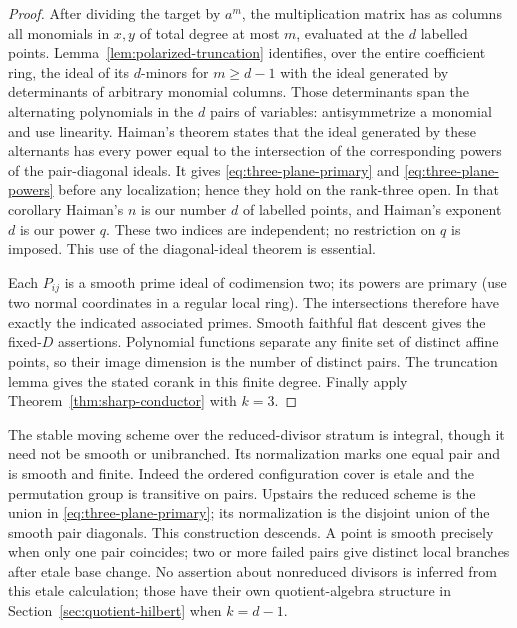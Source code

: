 \begin{proof}
After dividing the target by $a^m$, the multiplication matrix has
as columns all monomials in $x,y$ of total degree at most $m$,
evaluated at the $d$ labelled points. Lemma~\ref{lem:polarized-truncation}
identifies, over the entire coefficient ring, the ideal of its
$d$-minors for $m\ge d-1$ with the ideal generated by determinants
of arbitrary monomial columns. Those determinants span the
alternating polynomials in the $d$ pairs of variables: antisymmetrize
a monomial and use linearity. Haiman's theorem
\cite[Corollary 3.8.3]{Haiman} states that the ideal generated by these
alternants has every power equal to the intersection of the
corresponding powers of the pair-diagonal ideals. It gives
\eqref{eq:three-plane-primary} and \eqref{eq:three-plane-powers}
before any localization; hence they hold on the rank-three open.
In that corollary Haiman's $n$ is our number $d$ of labelled points,
and Haiman's exponent $d$ is our power $q$. These two indices are
independent; no restriction on $q$ is imposed.
This use of the diagonal-ideal theorem is essential.

Each $P_{ij}$ is a smooth prime ideal of codimension two; its powers
are primary (use two normal coordinates in a regular local ring).
The intersections therefore have exactly the indicated associated
primes. Smooth faithful flat descent gives the fixed-$D$ assertions.
Polynomial functions separate any finite set of distinct affine
points, so their image dimension is the number of distinct pairs.
The truncation lemma gives the stated corank in this finite degree.
Finally apply Theorem~\ref{thm:sharp-conductor} with $k=3$.
\end{proof}

The stable moving scheme over the reduced-divisor stratum is integral,
though it need not be smooth or unibranched. Its normalization marks
one equal pair and is smooth and finite. Indeed the ordered
configuration cover is etale and the permutation group is transitive
on pairs. Upstairs the reduced scheme is the union in
\eqref{eq:three-plane-primary}; its normalization is the disjoint
union of the smooth pair diagonals. This construction descends.
A point is smooth precisely when only one pair coincides; two or
more failed pairs give distinct local branches after etale base
change. No assertion about nonreduced divisors is inferred from this
etale calculation; those have their own quotient-algebra structure
in Section~\ref{sec:quotient-hilbert} when $k=d-1$.
